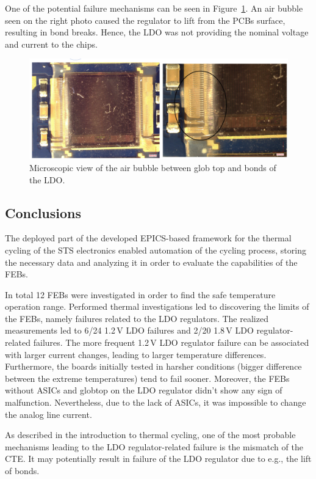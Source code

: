 One of the potential failure mechanisms can be seen in Figure~\ref{fig_ldo_lift}. An air bubble seen on the right photo caused the regulator to lift from the \glspl{PCB} surface, resulting in bond breaks. Hence, the \gls{LDO} was not providing the nominal voltage and current to the chips. 

\begin{figure}[!h]
\centering
\includegraphics[width=0.8\columnwidth]{Chapter4/images/FEB_81_LDO_lift.png}
\caption{Microscopic view of the air bubble between glob top and bonds of the \gls{LDO}.}
\label{fig_ldo_lift}
\end{figure}
\subsection{Conclusions}
The deployed part of the developed EPICS-based framework for the thermal cycling of the \gls{STS} electronics enabled automation of the cycling process, storing the necessary data and analyzing it in order to evaluate the capabilities of the \glspl{FEB}. 

In total 12 \glspl{FEB} were investigated in order to find the safe temperature operation range. Performed thermal investigations led to discovering the limits of the \glspl{FEB}, namely failures related to the \gls{LDO} regulators. The realized measurements led to 6/24 1.2\,V \gls{LDO} failures and 2/20 1.8\,V \gls{LDO} regulator-related failures. The more frequent 1.2\,V \gls{LDO} regulator failure can be associated with larger current changes, leading to larger temperature differences. Furthermore, the boards initially tested in harsher conditions (bigger difference between the extreme temperatures) tend to fail sooner. Moreover, the \glspl{FEB} without \glspl{ASIC} and globtop on the LDO regulator didn’t show any sign of malfunction. Nevertheless, due to the lack of \glspl{ASIC}, it was impossible to change the analog line current.

As described in the introduction to thermal cycling, one of the most probable mechanisms leading to the \gls{LDO} regulator-related failure is the mismatch of the \gls{CTE}. It may potentially result in failure of the \gls{LDO} regulator due to e.g., the lift of bonds.

